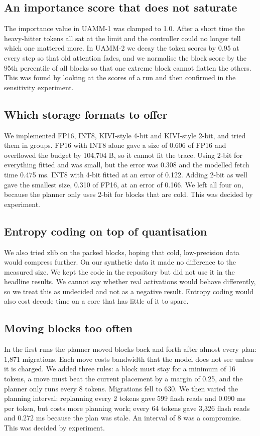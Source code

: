 \documentclass[12pt,a4paper]{report}
\begin{document}
\subsection{An importance score that does not saturate}
The importance value in UAMM-1 was clamped to 1.0. After a short time the heavy-hitter tokens all sat at the limit and the controller could no longer tell which one mattered more. In UAMM-2 we decay the token scores by 0.95 at every step so that old attention fades, and we normalise the block score by the 95th percentile of all blocks so that one extreme block cannot flatten the others. This was found by looking at the scores of a run and then confirmed in the sensitivity experiment.

\subsection{Which storage formats to offer}
We implemented FP16, INT8, KIVI-style 4-bit and KIVI-style 2-bit, and tried them in groups. FP16 with INT8 alone gave a size of 0.606 of FP16 and overflowed the budget by 104,704 B, so it cannot fit the trace. Using 2-bit for everything fitted and was small, but the error was 0.308 and the modelled fetch time 0.475 ms. INT8 with 4-bit fitted at an error of 0.122. Adding 2-bit as well gave the smallest size, 0.310 of FP16, at an error of 0.166. We left all four on, because the planner only uses 2-bit for blocks that are cold. This was decided by experiment.

\subsection{Entropy coding on top of quantisation}
We also tried zlib on the packed blocks, hoping that cold, low-precision data would compress further. On our synthetic data it made no difference to the measured size. We kept the code in the repository but did not use it in the headline results. We cannot say whether real activations would behave differently, so we treat this as undecided and not as a negative result. Entropy coding would also cost decode time on a core that has little of it to spare.

\subsection{Moving blocks too often}
In the first runs the planner moved blocks back and forth after almost every plan: 1,871 migrations. Each move costs bandwidth that the model does not see unless it is charged. We added three rules: a block must stay for a minimum of 16 tokens, a move must beat the current placement by a margin of 0.25, and the planner only runs every 8 tokens. Migrations fell to 630. We then varied the planning interval: replanning every 2 tokens gave 599 flash reads and 0.090 ms per token, but costs more planning work; every 64 tokens gave 3,326 flash reads and 0.272 ms because the plan was stale. An interval of 8 was a compromise. This was decided by experiment.
\end{document}
